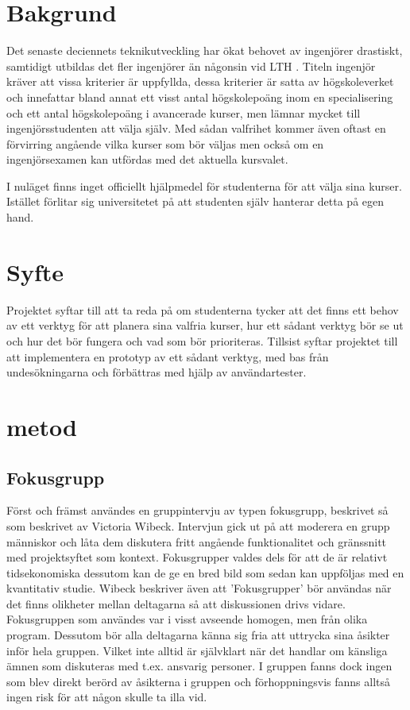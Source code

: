 \section{Bakgrund}

Det senaste deciennets teknikutveckling har ökat behovet av ingenjörer drastiskt, samtidigt utbildas det fler ingenjörer än någonsin vid LTH \cite{lth}.
Titeln ingenjör kräver att vissa kriterier är uppfyllda, dessa kriterier är satta av högskoleverket \cite{?} och innefattar bland annat ett visst antal högskolepoäng inom en specialisering och ett antal högskolepoäng i avancerade kurser, men lämnar mycket till ingenjörsstudenten att välja själv.
Med sådan valfrihet kommer även oftast en förvirring angående vilka kurser som bör väljas men också om en ingenjörsexamen kan utfördas med det aktuella kursvalet.

I nuläget finns inget officiellt hjälpmedel för studenterna för att välja sina kurser. Istället förlitar sig universitetet på att studenten själv hanterar detta på egen hand.

\section{Syfte}

Projektet syftar till att ta reda på om studenterna tycker att det finns ett behov av ett verktyg för att planera sina valfria kurser, hur ett sådant verktyg bör se ut och hur det bör fungera och vad som bör prioriteras. Tillsist syftar projektet till att implementera en prototyp av ett sådant verktyg, med bas från undesökningarna och förbättras med hjälp av användartester.

\section{metod}

\subsection{Fokusgrupp}

Först och främst användes en gruppintervju av typen fokusgrupp, beskrivet så som beskrivet av Victoria Wibeck.\cite{wibeck} Intervjun gick ut på att moderera en grupp människor och låta dem diskutera fritt angående funktionalitet och gränssnitt med projektsyftet som kontext. Fokusgrupper valdes dels för att de är relativt tidsekonomiska dessutom kan de ge en bred bild som sedan kan uppföljas med en kvantitativ studie. \cite{wibeck} Wibeck beskriver även att 'Fokusgrupper' bör användas när det finns olikheter mellan deltagarna så att diskussionen drivs vidare. Fokusgruppen som användes var i visst avseende homogen, men från olika program. Dessutom bör alla deltagarna känna sig fria att uttrycka sina åsikter inför hela gruppen. Vilket inte alltid är självklart när det handlar om känsliga ämnen som diskuteras med t.ex. ansvarig personer. I gruppen fanns dock ingen som blev direkt berörd av åsikterna i gruppen och förhoppningsvis fanns alltså ingen risk för att någon skulle ta illa vid.
